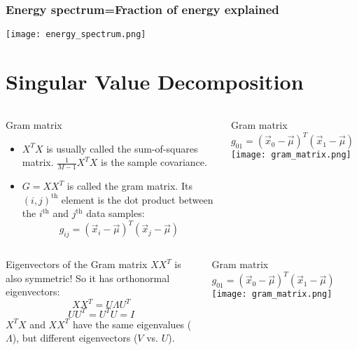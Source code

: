 \documentclass{beamer}
\begin{document}
\begin{frame}
  \frametitle{Energy  spectrum=Fraction of energy explained}
  \centerline{\texttt{[image: energy\_spectrum.png]}}
\end{frame}


\section[SVD]{Singular Value Decomposition}
\setcounter{subsection}{1}

\begin{frame}
  \begin{columns}
    \column{2.125in}
    \begin{block}{Gram matrix}
      \begin{itemize}
      \item $X^TX$ is usually called the sum-of-squares matrix.
        $\frac{1}{M-1}X^TX$ is the sample covariance.
      \item $G=XX^T$ is called the gram matrix.
        Its $(i,j)^{\textrm{th}}$ element is the dot product between
        the $i^{\textrm{th}}$ and $j^{\textrm{th}}$ data samples:
        \[
        g_{ij}=(\vec{x}_i-\vec\mu)^T(\vec{x}_j-\vec\mu)
        \]
      \end{itemize}
    \end{block}
    \column{2.125in}
    \begin{block}{Gram matrix $g_{01}=(\vec{x}_0-\vec\mu)^T(\vec{x}_1-\vec\mu)$}
      \texttt{[image: gram\_matrix.png]}
    \end{block}
  \end{columns}
\end{frame}

\begin{frame}
  \begin{columns}
    \column{2.125in}
    \begin{block}{Eigenvectors of the Gram matrix}
      $XX^T$ is also symmetric!  So it has orthonormal eigenvectors:
      \[
      XX^T=U\Lambda U^T
      \]
      \[
      UU^T=U^TU=I
      \]
      $X^TX$ and $XX^T$ have the same eigenvalues ($\Lambda$),
      but different eigenvectors ($V$ vs. $U$).
    \end{block}
    \column{2.125in}
    \begin{block}{Gram matrix $g_{01}=(\vec{x}_0-\vec\mu)^T(\vec{x}_1-\vec\mu)$}
      \texttt{[image: gram\_matrix.png]}
    \end{block}
  \end{columns}
\end{frame}
\end{document}
